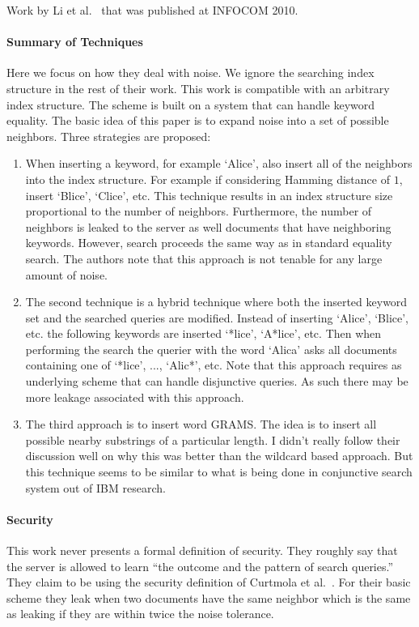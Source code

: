 \documentclass[11pt]{article}
\theoremstyle{remark}
\begin{document}
Work by Li et al.~\cite{li2010fuzzy,wang2013efficient} that was published at INFOCOM 2010.  

\paragraph{Summary of Techniques}  Here we focus on how they deal with noise.  We ignore the searching index structure in the rest of their work.  This work is compatible with an arbitrary index structure.  The scheme is built on a system that can handle keyword equality.  The basic idea of this paper is to expand noise into a set of possible neighbors.  Three strategies are proposed:

\begin{enumerate}
\item When inserting a keyword, for example `Alice', also insert all of the neighbors into the index structure.  For example if considering Hamming distance of $1$, insert `Blice', `Clice', etc.  This technique results in an index structure size proportional to the number of neighbors.  Furthermore, the number of neighbors is leaked to the server as well documents that have neighboring keywords.  However, search proceeds the same way as in standard equality search.  The authors note that this approach is not tenable for any large amount of noise.
\item The second technique is a hybrid technique where both the inserted keyword set and the searched queries are modified.  Instead of inserting `Alice', `Blice', etc. the following keywords are inserted `*lice', `A*lice', etc.  Then when performing the search the querier with the word `Alica' asks all documents containing one of `*lice', ..., `Alic*', etc.  Note that this approach requires as underlying scheme that can handle disjunctive queries.  As such there may be more leakage associated with this approach.
\item The third approach is to insert word GRAMS.  The idea is to insert all possible nearby substrings of a particular length.  I didn't really follow their discussion well on why this was better than the wildcard based approach.  But this technique seems to be similar to what is being done in conjunctive search system out of IBM research.
\end{enumerate}

\paragraph{Security}
This work never presents a formal definition of security.  They roughly say that the server is allowed to learn ``the outcome and the pattern of search queries.''  They claim to be using the security definition of Curtmola et al.~\cite{curtmola2011searchable}.  For their basic scheme they leak when two documents have the same neighbor which is the same as leaking if they are within twice the noise tolerance.  
\end{document}
